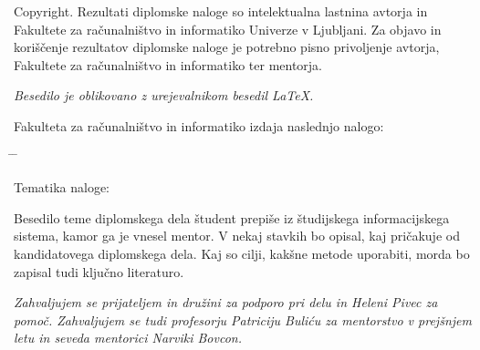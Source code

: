 \documentclass[a4paper, 12pt]{book}
\newcommand{\clearemptydoublepage}{\newpage{\pagestyle{empty}\cleardoublepage}}
\begin{document}
\noindent
{\sc Copyright}. 
Rezultati diplomske naloge so intelektualna lastnina avtorja in Fakultete za računalništvo in informatiko Univerze v Ljubljani.
Za objavo in koriščenje rezultatov diplomske naloge je potrebno pisno privoljenje avtorja, Fakultete za računalništvo in informatiko ter mentorja.

\begin{center}
\mbox{}\vfill
\emph{Besedilo je oblikovano z urejevalnikom besedil \LaTeX.}
\end{center}
\clearemptydoublepage

\thispagestyle{empty}
\vspace*{4cm}

\noindent
Fakulteta za računalništvo in informatiko izdaja naslednjo nalogo:
\medskip
\begin{tabbing}
\hspace{32mm}\= \hspace{6cm} \= \kill


Tematika naloge:
\end{tabbing}
Besedilo teme diplomskega dela študent prepiše iz študijskega informacijskega sistema, kamor ga je vnesel mentor. V nekaj stavkih bo opisal, kaj pričakuje od kandidatovega diplomskega dela. Kaj so cilji, kakšne metode uporabiti, morda bo zapisal tudi ključno literaturo.
\vspace{15mm}




\vspace{2cm}

\clearemptydoublepage

\thispagestyle{empty}\mbox{}\vfill\null\it%
\noindent
Zahvaljujem se prijateljem in družini za podporo pri delu in Heleni Pivec za pomoč.
Zahvaljujem se tudi profesorju Patriciju Buliću za mentorstvo v prejšnjem letu in seveda mentorici Narviki Bovcon.

\rm\normalfont

\clearemptydoublepage


\clearemptydoublepage
\end{document}
